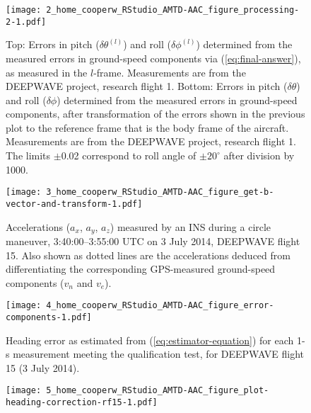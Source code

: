 \documentclass[english,british,amtd,bookmarks=false,unicode=true]{copernicus}\usepackage[]{graphicx}\usepackage[]{color}
\begin{document}
\begin{center}
\begin{figure}
\begin{centering}
\texttt{[image: 2\_home\_cooperw\_RStudio\_AMTD-AAC\_figure\_processing-2-1.pdf]}
\par\end{centering}

\caption{Top: Errors in pitch ($\delta\theta^{(l)}$) and roll ($\delta\phi^{(l)}$) determined from the measured errors in ground-speed components via (\ref{eq:final-answer}), as measured in the $l$-frame. Measurements are from the DEEPWAVE project, research flight 1. Bottom: Errors in pitch ($\delta\theta$) and roll ($\delta\phi$) determined from the measured errors in ground-speed components, after transformation of the errors shown in the previous plot to the reference frame that is the body frame of the aircraft. Measurements are from the DEEPWAVE project, research flight 1. The limits $\pm$0.02 correspond to roll angle of $\pm 20^{\circ}$ after division by 1000.\label{fig:processing-2}}
\end{figure}
\begin{figure}
\begin{centering}
\texttt{[image: 3\_home\_cooperw\_RStudio\_AMTD-AAC\_figure\_get-b-vector-and-transform-1.pdf]}
\par\end{centering}

\caption{Accelerations ($a_x$, $a_y$, $a_z$) measured by an INS during a circle maneuver, 3:40:00--3:55:00 UTC on 3 July 2014, DEEPWAVE flight 15. Also shown as dotted lines are the accelerations deduced from differentiating the corresponding GPS-measured ground-speed components ($v_n$ and $v_e$).\label{fig:get-b-vector-and-transform}}
\end{figure}
\begin{figure}
\begin{centering}
\texttt{[image: 4\_home\_cooperw\_RStudio\_AMTD-AAC\_figure\_error-components-1.pdf]}
\par\end{centering}

\caption{Heading error as estimated from (\ref{eq:estimator-equation}) for each 1-s measurement meeting the qualification test, for DEEPWAVE flight 15 (3 July 2014).\label{fig:error-components}}
\end{figure}
\begin{figure}
\begin{centering}
\texttt{[image: 5\_home\_cooperw\_RStudio\_AMTD-AAC\_figure\_plot-heading-correction-rf15-1.pdf]}
\par\end{centering}


\end{figure}
\end{center}
\end{document}

